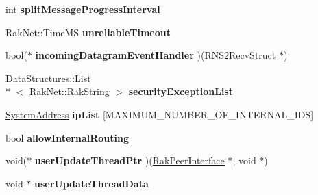 \begin{DoxyCompactItemize}
\item 
\hypertarget{class_rak_net_1_1_rak_peer_adc6be6147cb627eb46dcedfed5e47371}{int {\bfseries split\-Message\-Progress\-Interval}}\label{class_rak_net_1_1_rak_peer_adc6be6147cb627eb46dcedfed5e47371}

\item 
\hypertarget{class_rak_net_1_1_rak_peer_ae81eac7f8615b50ad1f050b019fe5f0c}{Rak\-Net\-::\-Time\-M\-S {\bfseries unreliable\-Timeout}}\label{class_rak_net_1_1_rak_peer_ae81eac7f8615b50ad1f050b019fe5f0c}

\item 
\hypertarget{class_rak_net_1_1_rak_peer_a063b9bd5024c3ef6d2a6e92998a46150}{bool($\ast$ {\bfseries incoming\-Datagram\-Event\-Handler} )(\hyperlink{struct_rak_net_1_1_r_n_s2_recv_struct}{R\-N\-S2\-Recv\-Struct} $\ast$)}\label{class_rak_net_1_1_rak_peer_a063b9bd5024c3ef6d2a6e92998a46150}

\item 
\hypertarget{class_rak_net_1_1_rak_peer_aae85af0f028d141402af1ded93c943ae}{\hyperlink{class_data_structures_1_1_list}{Data\-Structures\-::\-List}\\*
$<$ \hyperlink{class_rak_net_1_1_rak_string}{Rak\-Net\-::\-Rak\-String} $>$ {\bfseries security\-Exception\-List}}\label{class_rak_net_1_1_rak_peer_aae85af0f028d141402af1ded93c943ae}

\item 
\hypertarget{class_rak_net_1_1_rak_peer_a807c00d681f3d953ec2c74b8a07ca329}{\hyperlink{struct_rak_net_1_1_system_address}{System\-Address} {\bfseries ip\-List} \mbox{[}M\-A\-X\-I\-M\-U\-M\-\_\-\-N\-U\-M\-B\-E\-R\-\_\-\-O\-F\-\_\-\-I\-N\-T\-E\-R\-N\-A\-L\-\_\-\-I\-D\-S\mbox{]}}\label{class_rak_net_1_1_rak_peer_a807c00d681f3d953ec2c74b8a07ca329}

\item 
\hypertarget{class_rak_net_1_1_rak_peer_ad20dcbf9a5798e396fc304ba470182dd}{bool {\bfseries allow\-Internal\-Routing}}\label{class_rak_net_1_1_rak_peer_ad20dcbf9a5798e396fc304ba470182dd}

\item 
\hypertarget{class_rak_net_1_1_rak_peer_a3b48f7b530dbf134cea9d8dac117becb}{void($\ast$ {\bfseries user\-Update\-Thread\-Ptr} )(\hyperlink{class_rak_net_1_1_rak_peer_interface}{Rak\-Peer\-Interface} $\ast$, void $\ast$)}\label{class_rak_net_1_1_rak_peer_a3b48f7b530dbf134cea9d8dac117becb}

\item 
\hypertarget{class_rak_net_1_1_rak_peer_ad5a479962e7fc53c00599467e7cf62ab}{void $\ast$ {\bfseries user\-Update\-Thread\-Data}}\label{class_rak_net_1_1_rak_peer_ad5a479962e7fc53c00599467e7cf62ab}


\end{DoxyCompactItemize}
